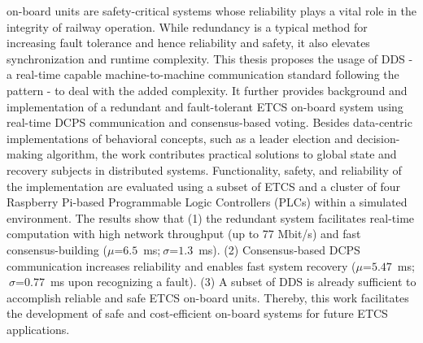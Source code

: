 
\null\vfil
\begin{center}\textsf{\textbf{\abstractname}}\end{center}
%
\noindent {} on-board units are safety-critical systems whose reliability plays a vital role in the integrity of railway operation.
While redundancy is a typical method for increasing fault tolerance and hence reliability and safety, it also elevates synchronization and runtime complexity.
This thesis proposes the usage of DDS - a real-time capable machine-to-machine communication standard following the  pattern - to deal with the added complexity.
It further provides background and implementation of a redundant and fault-tolerant ETCS on-board system using real-time DCPS communication and consensus-based voting.
Besides data-centric implementations of behavioral concepts, such as a leader election and decision-making algorithm, the work contributes practical solutions to global state and recovery subjects in distributed systems.
Functionality, safety, and reliability of the implementation are evaluated using a subset of ETCS and a cluster of four Raspberry Pi-based Programmable Logic Controllers (PLCs) within a simulated environment.
The results show that (1) the redundant system facilitates real-time computation with high network throughput (up to 77 Mbit/s) and fast consensus-building ($\mu$=$6.5$~ms;$~\sigma$=$1.3$~ms). (2) Consensus-based DCPS communication increases reliability and enables fast system recovery ($\mu$=$5.47$~ms;$~\sigma$=$0.77$~ms upon recognizing a fault).
(3) A subset of DDS is already sufficient to accomplish reliable and safe ETCS on-board units.
Thereby, this work facilitates the development of safe and cost-efficient on-board systems for future ETCS applications.

\vfil\null
\clearpage

